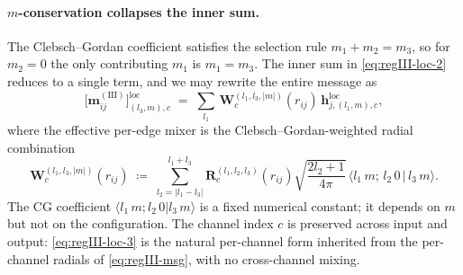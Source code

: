 \documentclass[11pt,a4paper]{article}
\newcommand{\bh}{\bm{h}}
\theoremstyle{plain}
\theoremstyle{definition}
\theoremstyle{remark}
\begin{document}
    \paragraph{$m$-conservation collapses the inner sum.}
    The Clebsch--Gordan coefficient satisfies the selection rule $m_1+m_2=m_3$, so
    for $m_2=0$ the only contributing $m_1$ is $m_1=m_3$. The inner sum in
    \eqref{eq:regIII-loc-2} reduces to a single term, and we may rewrite the entire
    message as
    \begin{equation}\label{eq:regIII-loc-3}
        \boxed{\;\bigl[\bm{m}_{ij}^{\mathrm{(III)}}\bigr]^{\mathrm{loc}}_{(l_3,m),c}
            \;=\;\sum_{l_1}\,\bm{W}^{(l_1,l_3,|m|)}_{c}(r_{ij})\,\bh^{\mathrm{loc}}_{j,(l_1,m),c},\;}
    \end{equation}
    where the effective per-edge mixer is the Clebsch--Gordan-weighted radial combination
    \begin{equation}\label{eq:W-from-R}
        \bm{W}^{(l_1,l_3,|m|)}_{c}(r_{ij})\;\coloneqq\;\sum_{l_2=|l_1-l_3|}^{l_1+l_3}\bm{R}^{(l_1,l_2,l_3)}_c(r_{ij})\sqrt{\frac{2l_2+1}{4\pi}}\,\bigl\langle l_1\,m;\,l_2\,0\,\big|\,l_3\,m\bigr\rangle.
    \end{equation}
    The CG coefficient $\langle l_1\,m;l_2\,0|l_3\,m\rangle$ is a fixed numerical constant; it depends on $m$ but not on the configuration.
    The channel index $c$ is preserved across input and output: \eqref{eq:regIII-loc-3} is the natural per-channel form inherited from the per-channel radials of \eqref{eq:regIII-msg}, with no cross-channel mixing.
\end{document}
